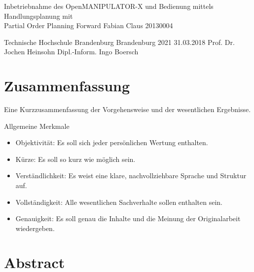 



  \JMUTitle
      {Inbetriebnahme des OpenMANIPULATOR-X und Bedienung mittels Handlungsplanung mit\\ Partial Order Planning Forward}        %
      {Fabian Claus}                        %
      {20130004}
      
      {Technische Hochschule Brandenburg}  %
      {Brandenburg 2021}                          %
      {31.03.2018}                              %
      {Prof. Dr. Jochen Heinsohn}               %
      {Dipl.-Inform. Ingo Boersch}                          %

  \clearpage

\lhead{}
    \setcounter{page}{1}

\tableofcontents
\clearpage

\section*{Zusammenfassung}

Eine Kurzzusammenfassung der Vorgehensweise und der wesentlichen Ergebnisse.

Allgemeine Merkmale
\begin{itemize}
    \item Objektivität: Es soll sich jeder persönlichen Wertung enthalten.
    \item Kürze: Es soll so kurz wie möglich sein.
    \item Verständlichkeit: Es weist eine klare, nachvollziehbare Sprache und Struktur auf.
    \item Vollständigkeit: Alle wesentlichen Sachverhalte sollen enthalten sein.
    \item Genauigkeit: Es soll genau die Inhalte und die Meinung der Originalarbeit wiedergeben.
\end{itemize}{}

\newpage
{}
\section*{Abstract}

